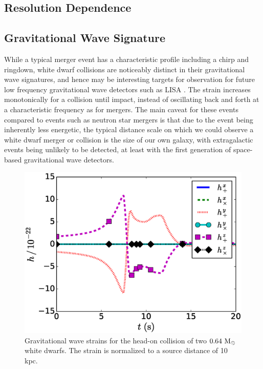 \documentclass[12pt]{article}
\begin{document}




\subsection{Resolution Dependence}
\label{sec:collision_resolution}



\subsection{Gravitational Wave Signature}
\label{sec:collision_gravitational_waves}

While a typical merger event has a characteristic profile including a chirp and ringdown,
white dwarf collisions are noticeably distinct in their gravitational wave signatures, and
hence may be interesting targets for observation for future low frequency gravitational
wave detectors such as LISA \citep{eLISA}. The strain increases monotonically for a collision until impact,
instead of oscillating back and forth at a characteristic frequency as for mergers.
The main caveat for these events compared to events
such as neutron star mergers is that due to the event being inherently less energetic,
the typical distance scale on which we could observe a white dwarf merger or collision
is the size of our own galaxy, with extragalactic events being unlikely to be
detected, at least with the first generation of space-based gravitational wave
detectors.

\begin{figure}
  \centering
  \includegraphics[scale=0.8]{plots/gw_signal_2D}
  \caption[Gravitational wave strain, head-on collision]
          {Gravitational wave strains for the head-on collision of two $0.64\ \mathrm{M}_\odot$
           white dwarfs. The strain is normalized to a source distance of 10 kpc.
           \label{fig:gw_signal_2D}}
\end{figure}
\end{document}
